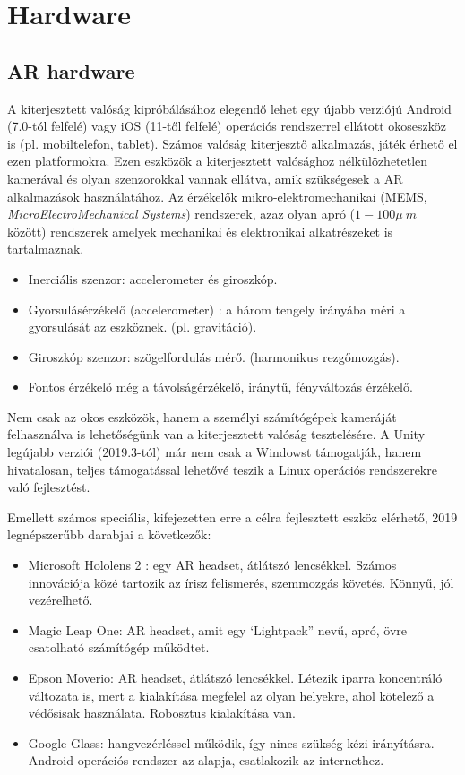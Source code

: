 \documentclass[a4paper,12pt]{article}
\begin{document}
\section{Hardware}

\subsection{AR hardware}

A kiterjesztett valóság kipróbálásához elegendő lehet egy újabb verziójú Android (7.0-tól felfelé) vagy iOS (11-től felfelé) operációs rendszerrel ellátott okoseszköz is (pl. mobiltelefon, tablet).
Számos valóság kiterjesztő alkalmazás, játék érhető el ezen platformokra. 
Ezen eszközök a kiterjesztett valósághoz nélkülözhetetlen kamerával és olyan szenzorokkal vannak ellátva, amik szükségesek a AR alkalmazások használatához.
Az érzékelők mikro-elektromechanikai (MEMS, \textit{MicroElectroMechanical Systems}) 
rendszerek, azaz olyan apró ($1-100\mu\ m$ között) rendszerek amelyek mechanikai és elektronikai alkatrészeket is tartalmaznak.
\begin{itemize}
\item Inerciális szenzor: accelerometer és giroszkóp.
\item Gyorsulásérzékelő (accelerometer) : a három tengely irányába méri a gyorsulását az eszköznek. (pl. gravitáció). 
\item Giroszkóp szenzor: szögelfordulás mérő. (harmonikus rezgőmozgás).
\item Fontos érzékelő még a távolságérzékelő, iránytű, fényváltozás érzékelő.
\end{itemize}

Nem csak az okos eszközök, hanem a személyi számítógépek kameráját felhasználva is lehetőségünk van a kiterjesztett valóság tesztelésére.  A Unity legújabb verziói (2019.3-tól) már nem csak a Windowst támogatják, hanem hivatalosan, teljes támogatással lehetővé teszik a Linux operációs rendszerekre való fejlesztést.

Emellett számos speciális, kifejezetten erre a célra fejlesztett eszköz elérhető, 2019 legnépszerűbb darabjai a következők:
\begin{itemize}
\item Microsoft Hololens 2 :  egy AR headset, átlátszó lencsékkel. Számos innovációja közé tartozik az írisz felismerés, szemmozgás követés. Könnyű, jól vezérelhető.
\item Magic Leap One:  AR headset, amit egy ‘Lightpack” nevű, apró, övre csatolható számítógép működtet. 
\item Epson Moverio: AR headset, átlátszó lencsékkel. Létezik iparra koncentráló változata is, mert a kialakítása megfelel az olyan helyekre, ahol kötelező a védősisak használata. Robosztus kialakítása van. 
\item Google Glass: hangvezérléssel működik, így nincs szükség kézi irányításra. Android operációs rendszer az alapja, csatlakozik az internethez.
\end{itemize}
\end{document}
